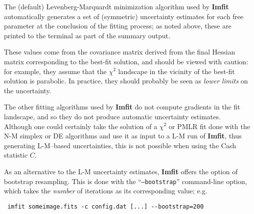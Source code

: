 \documentclass[10pt,a4paper,article]{memoir}
\newcommand{\imfit}{\textbf{Imfit}}
\newcommand{\chisquare}{\ensuremath{\chi^{2}}}
\newcommand{\pmlr}{PMLR}
\begin{document}
The (default) Levenberg-Marquardt minimization algorithm used by
\imfit{} automatically generates a set of (symmetric) uncertainty
estimates for each free parameter at the conclusion of the fitting
process; as noted above, these are printed to the terminal as part of
the summary output.

These values come from the covariance matrix derived from the final
Hessian matrix corresponding to the best-fit solution, and should be
viewed with caution: for example, they assume that the \chisquare{}
landscape in the vicinity of the best-fit solution is parabolic. In
practice, they should probably be seen as \textit{lower limits} on the
uncertainty.

The other fitting algorithms used by \imfit{} do not compute gradients
in the fit landscape, and so they do not produce automatic uncertainty
estimates. Although one could certainly take the solution of a
\chisquare{} or \pmlr{} fit done with the N-M simplex or DE algorithms
and use it as input to a L-M run of \imfit, thus generating L-M--based
uncertainties, this is not possible when using the Cash statistic $C$.

As an alternative to the L-M uncertainty estimates, \imfit{} offers the
option of bootstrap resampling. This is done with the
``\texttt{--bootstrap}'' command-line option, which takes the
\textit{number} of iterations as its corresponding value; e.g.

\begin{verbatim} imfit someimage.fits -c config.dat [...] --bootstrap=200
\end{verbatim}
\end{document}
